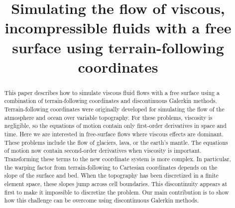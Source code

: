 \documentclass[gmd, manuscript]{copernicus}
\begin{document}
\title{Simulating the flow of viscous, incompressible fluids with a free surface using terrain-following coordinates}





\received{}
\pubdiscuss{} %
\revised{}
\accepted{}
\published{}



\maketitle

\begin{abstract}
This paper describes how to simulate viscous fluid flows with a free surface using a combination of terrain-following coordinates and discontinuous Galerkin methods.
Terrain-following coordinates were originally developed for simulating the flow of the atmosphere and ocean over variable topography.
For these problems, viscosity is negligible, so the equations of motion contain only first-order derivatives in space and time.
Here we are interested in free-surface flows where viscous effects are dominant.
These problems include the flow of glaciers, lava, or the earth's mantle.
The equations of motion now contain second-order derivatives when viscosity is important.
Transforming these terms to the new coordinate system is more complex.
In particular, the warping factor from terrain-following to Cartesian coordinates depends on the slope of the surface and bed.
When the topography has been discretized in a finite element space, these slopes jump across cell boundaries.
This discontinuity appears at first to make it impossible to discretize the problem.
Our main contribution is to show how this challenge can be overcome using discontinuous Galerkin methods.
\end{abstract}

\introduction
\end{document}
